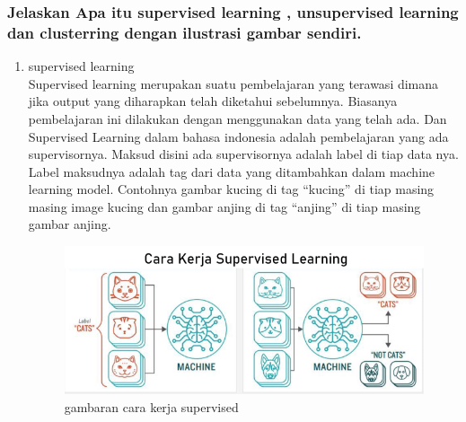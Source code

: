 \subsubsection{Jelaskan Apa itu supervised learning , unsupervised learning dan clusterring dengan ilustrasi gambar sendiri.}
\begin{enumerate}
\item supervised learning
\hfill\\
Supervised learning merupakan suatu pembelajaran yang terawasi dimana jika output yang diharapkan telah diketahui sebelumnya. Biasanya pembelajaran ini dilakukan dengan menggunakan data yang telah ada. Dan Supervised Learning dalam bahasa indonesia adalah pembelajaran yang ada supervisornya. Maksud disini ada supervisornya adalah label di tiap data nya. Label maksudnya adalah tag dari data yang ditambahkan dalam machine learning model. Contohnya gambar kucing di tag “kucing” di tiap masing masing image kucing dan gambar anjing di tag “anjing” di tiap masing gambar anjing.
\begin{figure}[H]
    \includegraphics[width=12cm]{figures/1174083/figures2/2.png}
    \centering
    \caption{gambaran cara kerja supervised}
\end{figure}


\end{enumerate}
